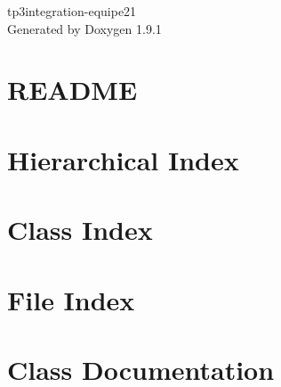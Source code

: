\let\mypdfximage\pdfximage\def\pdfximage{\immediate\mypdfximage}\documentclass[twoside]{book}
\newcommand{\+}{\discretionary{\mbox{\scriptsize$\hookleftarrow$}}{}{}}
\newcommand{\clearemptydoublepage}{%
  \newpage{\pagestyle{empty}\cleardoublepage}%
}
\begin{document}
\raggedbottom

\hypersetup{pageanchor=false,
             bookmarksnumbered=true,
             pdfencoding=unicode
            }
\begin{titlepage}
\vspace*{7cm}
\begin{center}%
{\Large tp3integration-\/equipe21 }\\
\vspace*{1cm}
{\large Generated by Doxygen 1.9.1}\\
\end{center}
\end{titlepage}
\clearemptydoublepage
{}
\tableofcontents
\clearemptydoublepage
{}
\hypersetup{pageanchor=true}

\chapter{README}
\label{md__r_e_a_d_m_e}

\chapter{Hierarchical Index}

\chapter{Class Index}

\chapter{File Index}

\chapter{Class Documentation}


































\end{document}

